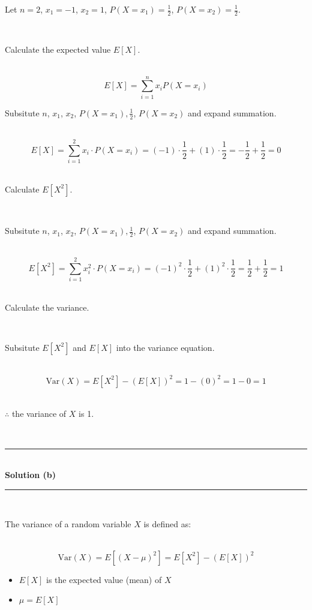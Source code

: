 \documentclass{article}
\begin{document}
\parbox{\textwidth}{Let $n = 2$, $x_1 = -1$, $x_2 = 1$, $P(X = x_1) = \frac{1}{2}$, $P(X = x_2) = \frac{1}{2}$.}\\

\parbox{\textwidth}{Calculate the expected value $E[X]$.}\\

$$E[X] = \sum^{n}_{i=1} x_i P(X = x_i)$$

\parbox{\textwidth}{Subsitute $n$, $x_1$, $x_2$, $P(X = x_1), \frac{1}{2}$, $P(X = x_2)$ and expand summation.}\\

$$E[X] = \sum^2_{i=1} x_i \cdot P(X = x_i) = (-1) \cdot \frac{1}{2} + (1) \cdot \frac{1}{2} = -\frac{1}{2} + \frac{1}{2} = 0$$\\

\parbox{\textwidth}{Calculate $E[X^2]$.}\\

\parbox{\textwidth}{Subsitute $n$, $x_1$, $x_2$, $P(X = x_1), \frac{1}{2}$, $P(X = x_2)$ and expand summation.}\\

$$E[X^2] = \sum^2_{i=1} x_i^2 \cdot P(X = x_i) = (-1)^2 \cdot \frac{1}{2} + (1)^2 \cdot \frac{1}{2} = \frac{1}{2} + \frac{1}{2} = 1$$\\

\parbox{\textwidth}{Calculate the variance.}\\

\parbox{\textwidth}{Subsitute $E[X^2]$ and $E[X]$ into the variance equation.}\\

$$\text{Var}(X) = E[X^2] - (E[X])^2 = 1 - (0)^2 = 1 - 0 = 1$$\\

\parbox{\textwidth}{$\therefore$ the variance of $X$ is 1.}\\

\noindent\rule{\textwidth}{0.4pt}\\

\textbf{Solution (b)}

\noindent\rule{\textwidth}{0.4pt}\\

\parbox{\textwidth}{The variance of a random variable $X$ is defined as:}\\

$$\text{Var}(X) = E[(X - \mu)^2] = E[X^2] - (E[X])^2$$

\begin{itemize}
    \item $E[X]$ is the expected value (mean) of $X$
    \item $\mu = E[X]$
\end{itemize}
\end{document}
